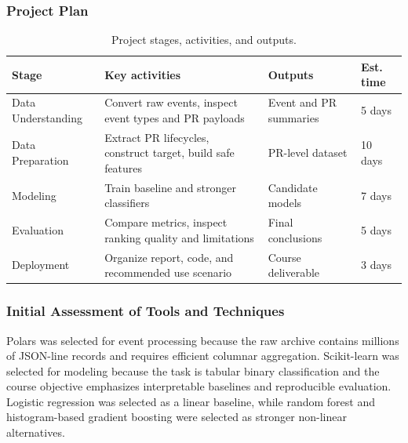 \subsubsection*{Project Plan}

\begin{table}[H]
    \centering
    \small
    \caption{Project stages, activities, and outputs.}
    \begin{tabularx}{\textwidth}{lXXl}
        \toprule
        Stage & Key activities & Outputs & Est. time \\
        \midrule
        Data Understanding & Convert raw events, inspect event types and PR payloads & Event and PR summaries
        & 5 days \\
        Data Preparation & Extract PR lifecycles, construct target, build safe features & PR-level dataset & 10 days \\
        Modeling & Train baseline and stronger classifiers & Candidate models & 7 days \\
        Evaluation & Compare metrics, inspect ranking quality and limitations & Final conclusions & 5 days \\
        Deployment & Organize report, code, and recommended use scenario & Course deliverable & 3 days \\
        \bottomrule
    \end{tabularx}
\end{table}

\subsubsection*{Initial Assessment of Tools and Techniques}

Polars was selected for event processing because the raw archive contains millions of JSON-line records and
requires efficient columnar aggregation. Scikit-learn was selected for modeling because the task is tabular
binary classification and the course objective emphasizes interpretable baselines and reproducible
evaluation. Logistic regression was selected as a linear baseline, while random forest and histogram-based
gradient boosting were selected as stronger non-linear alternatives.
